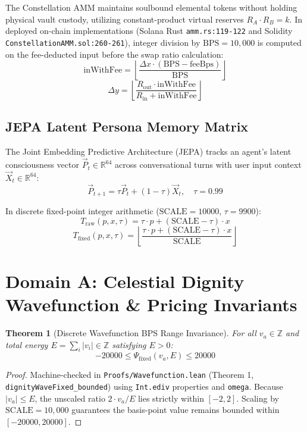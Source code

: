 \documentclass[11pt,a4paper]{article}
\theoremstyle{plain}
\newtheorem{theorem}{Theorem}[section]
\theoremstyle{definition}
\theoremstyle{remark}
\begin{document}
The Constellation AMM maintains soulbound elemental tokens without holding physical vault custody, utilizing constant-product virtual reserves $R_A \cdot R_B = k$. In deployed on-chain implementations (Solana Rust \texttt{amm.rs:119-122} and Solidity \texttt{ConstellationAMM.sol:260-261}), integer division by $\text{BPS} = 10,000$ is computed on the fee-deducted input before the swap ratio calculation:
\begin{equation}
    \text{inWithFee} = \left\lfloor \frac{\Delta x \cdot (\text{BPS} - \text{feeBps})}{\text{BPS}} \right\rfloor
\end{equation}
\begin{equation}
    \Delta y = \left\lfloor \frac{R_{\text{out}} \cdot \text{inWithFee}}{R_{\text{in}} + \text{inWithFee}} \right\rfloor
\end{equation}

\subsection{JEPA Latent Persona Memory Matrix}

The Joint Embedding Predictive Architecture (JEPA) tracks an agent's latent consciousness vector $\vec{P}_t \in \mathbb{R}^{64}$ across conversational turns with user input context $\vec{X}_t \in \mathbb{R}^{64}$:
\begin{equation}
    \vec{P}_{t+1} = \tau \vec{P}_t + (1 - \tau) \vec{X}_t, \quad \tau = 0.99
\end{equation}

In discrete fixed-point integer arithmetic ($\text{SCALE} = 10000$, $\tau = 9900$):
\begin{equation}
    T_{\text{raw}}(p, x, \tau) = \tau \cdot p + (\text{SCALE} - \tau) \cdot x
\end{equation}
\begin{equation}
    T_{\text{fixed}}(p, x, \tau) = \left\lfloor \frac{\tau \cdot p + (\text{SCALE} - \tau) \cdot x}{\text{SCALE}} \right\rfloor
\end{equation}

\section{Domain A: Celestial Dignity Wavefunction \& Pricing Invariants}

\begin{theorem}[Discrete Wavefunction BPS Range Invariance]
\label{thm:wavefunction_fixed}
For all $v_a \in \mathbb{Z}$ and total energy $E = \sum_i |v_i| \in \mathbb{Z}$ satisfying $E > 0$:
\begin{equation}
    -20000 \le \Psi_{\text{fixed}}(v_a, E) \le 20000
\end{equation}
\end{theorem}
\begin{proof}
Machine-checked in \texttt{Proofs/Wavefunction.lean} (Theorem 1, \texttt{dignityWaveFixed\_bounded}) using \texttt{Int.ediv} properties and \texttt{omega}. Because $|v_a| \le E$, the unscaled ratio $2 \cdot v_a / E$ lies strictly within $[-2, 2]$. Scaling by $\text{SCALE} = 10,000$ guarantees the basis-point value remains bounded within $[-20000, 20000]$.
\end{proof}
\end{document}
